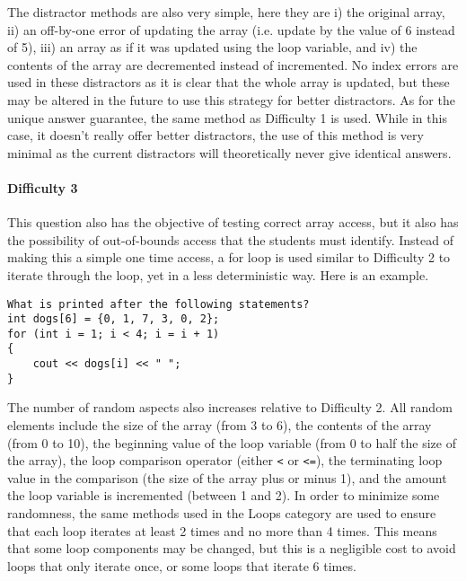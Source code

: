 \documentclass{article}
\begin{document}
The distractor methods are also very simple, here they are i) the original array, ii) an off-by-one error of updating the array (i.e. update by the value of 6 instead of 5), iii) an array as if it was
updated using the loop variable, and iv) the contents of the array are decremented instead of incremented. No index errors are used in these distractors as it is clear that the whole array is 
updated, but these may be altered in the future to use this strategy for better distractors. As for the unique answer guarantee, the same method as Difficulty 1 is used. While in this case, it
doesn't really offer better distractors, the use of this method is very minimal as the current distractors will theoretically never give identical answers. 

\paragraph{Difficulty 3} \hfill \par

This question also has the objective of testing correct array access, but it also has the possibility of out-of-bounds access that the students must identify. Instead of making this a simple one time
access, a for loop is used similar to Difficulty 2 to iterate through the loop, yet in a less deterministic way. Here is an example.

\begin{lstlisting}
What is printed after the following statements?
int dogs[6] = {0, 1, 7, 3, 0, 2}; 
for (int i = 1; i < 4; i = i + 1) 
{ 
	cout << dogs[i] << " ";
} 
\end{lstlisting}


The number of random aspects also increases relative to Difficulty 2. All random elements include the size of the array (from 3 to 6), the contents of the array (from 0 to 10), the beginning value
of the loop variable (from 0 to half the size of the array), the loop comparison operator (either \verb;<; or \verb;<=;), the terminating loop value in the comparison (the size of the array 
plus or minus 1), and the amount the loop variable is incremented (between 1 and 2). In order to minimize some randomness, the same methods used in the Loops category are used to ensure
that each loop iterates at least 2 times and no more than 4 times. This means that some loop components may be changed, but this is a negligible cost to avoid loops that only iterate once, or 
some loops that iterate 6 times.
\end{document}
